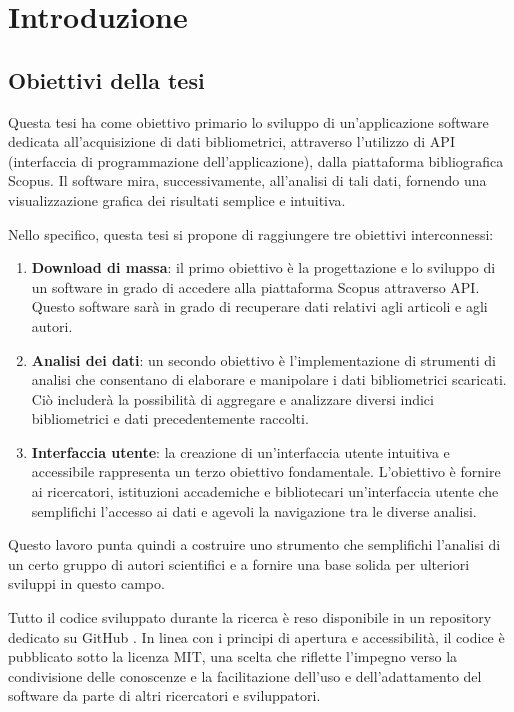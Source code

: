 \chapter{Introduzione}
\section{Obiettivi della tesi}
Questa tesi ha come obiettivo primario lo sviluppo di un'applicazione software dedicata all'acquisizione di dati  bibliometrici, attraverso l'utilizzo di API (interfaccia di programmazione dell'applicazione), dalla piattaforma bibliografica Scopus. Il software mira, successivamente, all'analisi di tali dati, fornendo una visualizzazione grafica dei risultati semplice e intuitiva.

Nello specifico, questa tesi si propone di raggiungere tre obiettivi interconnessi:
\begin{enumerate}
    \item \textbf{Download di massa}: il primo obiettivo è la progettazione e lo sviluppo di un software in grado di accedere alla piattaforma Scopus attraverso API. Questo software sarà in grado di recuperare dati relativi agli articoli e agli autori.

    \item \textbf{Analisi dei dati}: un secondo obiettivo è l'implementazione di strumenti di analisi che consentano di elaborare e manipolare i dati bibliometrici scaricati. Ciò includerà la possibilità di aggregare e analizzare diversi indici bibliometrici e dati precedentemente raccolti.

    \item \textbf{Interfaccia utente}: la creazione di un'interfaccia utente intuitiva e accessibile rappresenta un terzo obiettivo fondamentale. L'obiettivo è fornire ai ricercatori, istituzioni accademiche e bibliotecari un'interfaccia utente che semplifichi l'accesso ai dati e agevoli la navigazione tra le diverse analisi.
\end{enumerate}
Questo lavoro punta quindi a costruire uno strumento che semplifichi l'analisi di un certo gruppo di autori scientifici e a fornire una base solida per ulteriori sviluppi in questo campo.

Tutto il codice sviluppato durante la ricerca è reso disponibile in un repository dedicato su GitHub \cite{codeBachelorThesis}. In linea con i principi di apertura e accessibilità, il codice è pubblicato sotto la licenza MIT, una scelta che riflette l'impegno verso la condivisione delle conoscenze e la facilitazione dell'uso e dell'adattamento del software da parte di altri ricercatori e sviluppatori.


